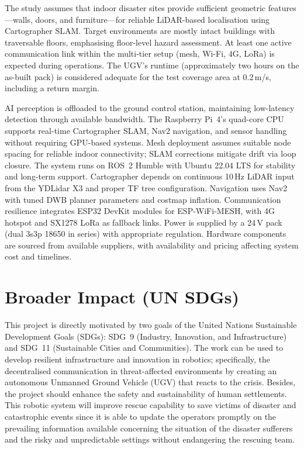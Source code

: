 The study assumes that indoor disaster sites provide sufficient geometric features---walls, doors, and furniture---for reliable LiDAR-based localisation using Cartographer SLAM. Target environments are mostly intact buildings with traversable floors, emphasising floor-level hazard assessment. At least one active communication link within the multi-tier setup (mesh, Wi-Fi, 4G, LoRa) is expected during operations. The UGV's runtime (approximately two hours on the as-built pack) is considered adequate for the test coverage area at 0.2\,m/s, including a return margin.

AI perception is offloaded to the ground control station, maintaining low-latency detection through available bandwidth. The Raspberry Pi~4's quad-core CPU supports real-time Cartographer SLAM, Nav2 navigation, and sensor handling without requiring GPU-based systems. Mesh deployment assumes suitable node spacing for reliable indoor connectivity; SLAM corrections mitigate drift via loop closure. The system runs on ROS~2 Humble with Ubuntu 22.04 LTS for stability and long-term support. Cartographer depends on continuous 10\,Hz LiDAR input from the YDLidar X3 and proper TF tree configuration. Navigation uses Nav2 with tuned DWB planner parameters and costmap inflation. Communication resilience integrates ESP32 DevKit modules for ESP-WiFi-MESH, with 4G hotspot and SX1278 LoRa as fallback links. Power is supplied by a 24\,V pack (dual 3s3p 18650 in series) with appropriate regulation. Hardware components are sourced from available suppliers, with availability and pricing affecting system cost and timelines.

\section{Broader Impact (UN SDGs)}
\label{sec:sdg}

This project is directly motivated by two goals of the United Nations Sustainable Development Goals (SDGs): SDG~9 (Industry, Innovation, and Infrastructure) and SDG~11 (Sustainable Cities and Communities). The work can be used to develop resilient infrastructure and innovation in robotics; specifically, the decentralised communication in threat-affected environments by creating an autonomous Unmanned Ground Vehicle (UGV) that reacts to the crisis. Besides, the project should enhance the safety and sustainability of human settlements. This robotic system will improve rescue capability to save victims of disaster and catastrophic events since it is able to update the operators promptly on the prevailing information available concerning the situation of the disaster sufferers and the risky and unpredictable settings without endangering the rescuing team.

